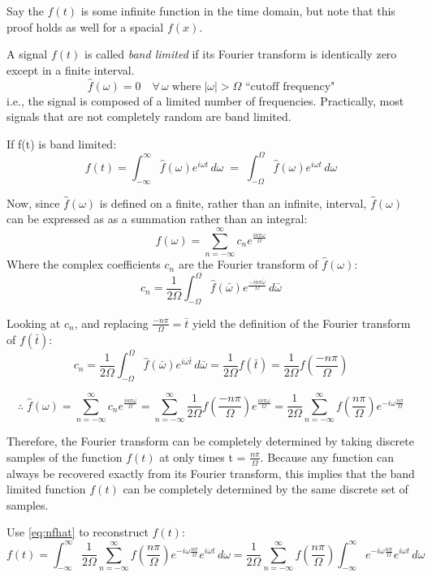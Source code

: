 \documentclass[12pt]{article}
\newcommand{\inftyint}{\int_{-\infty}^{\infty}}
\begin{document}
Say the \(f(t)\) is some infinite function in the time domain, but note that this proof holds as well for a spacial \(f(x)\).

A signal \(f(t)\) is called \emph{band limited} if its Fourier transform is identically zero except in a finite interval.
\[\hat{f}(\omega) = 0 \quad \forall \, \omega \; \text{where} \; |\omega| > \Omega \text{ ``cutoff frequency"}\]
i.e., the signal is composed of a limited number of frequencies. Practically, most signals that are not completely random are band limited.

If f(t) is band limited:
\[f(t) = \inftyint \hat{f}(\omega)e^{i\omega t} \,d\omega \; = \; \int_{-\Omega}^{\Omega} \hat{f}(\omega)e^{i\omega t} \,d\omega\]

Now, since \( \hat{f}(\omega) \) is defined on a finite, rather than an infinite, interval, \( \hat{f}(\omega) \) can be expressed as as a summation rather than an integral:
\[\hat{f}(\omega) = \sum_{n = -\infty}^{\infty} c_{n}e^{\frac{i n \pi \omega}{\Omega}} \]
Where the complex coefficients \( c_n\) are the Fourier transform of \( \hat{f}(\omega) \):
\[ c_n = \frac{1}{2\Omega} \int_{-\Omega}^{\Omega} \hat{f}(\bar{\omega})e^{\frac{-i n \pi \bar{ \omega}}{\Omega}}\,d\bar{\omega}\]

Looking at \(c_n\), and replacing \( \frac{-n\pi}{\Omega} = \bar{t}\) yield the definition of the Fourier transform of \( f(\bar{t})\):
\[ c_n = \frac{1}{2\Omega} \int_{-\Omega}^{\Omega} \hat{f}(\bar{\omega})e^{i\bar{\omega}\bar{t}}\,d\bar{\omega} = \frac{1}{2\Omega} f(\bar{t}) = \frac{1}{2\Omega} f(\frac{-n\pi}{\Omega})\]

\begin{equation}
\label{eq:nfhat}
\therefore \; \hat{f}(\omega) = \sum_{n = -\infty}^{\infty} c_{n}e^{\frac{i n \pi \omega}{\Omega}} = \sum_{n = -\infty}^{\infty} \frac{1}{2\Omega} f(\frac{-n\pi}{\Omega})e^{\frac{i n \pi \omega}{\Omega}} = \frac{1}{2\Omega} \sum_{n = -\infty}^{\infty} f(\frac{n\pi}{\Omega})e^{-i \omega \frac{n \pi}{\Omega} } 
\end{equation}

Therefore, the Fourier transform can be completely determined by taking discrete samples of the function \( f(t) \) at only times t = \( \frac{n\pi}{\Omega}\). Because any function can always be recovered exactly from its Fourier transform, this implies that the band limited function \( f(t) \) can be completely determined by the same discrete set of samples.

Use \eqref{eq:nfhat} to reconstruct \( f(t)  \):
\begin{equation}
\label{eq:nft}
f(t) = \inftyint \frac{1}{2\Omega} \sum_{n = -\infty}^{\infty} f(\frac{n\pi}{\Omega})e^{-i \omega \frac{n \pi}{\Omega} } e^{i\omega t} \,d\omega = \frac{1}{2\Omega} \sum_{n = -\infty}^{\infty} f(\frac{n\pi}{\Omega}) \inftyint e^{-i \omega \frac{n \pi}{\Omega} } e^{i\omega t} \, d\omega
\end{equation}
\end{document}
